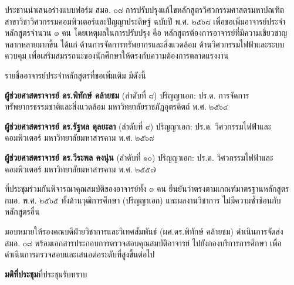 \documentclass{meetingminutes}
\begin{document}
ประธานนำเสนอร่างแบบฟอร์ม สมอ. ๐๘ การปรับปรุงแก้ไขหลักสูตรวิศวกรรมศาสตรมหาบัณฑิต
สาขาวิชาวิศวกรรมคอมพิวเตอร์และปัญญาประดิษฐ์ ฉบับปี พ.ศ. ๒๕๖๘
เพื่อขอเพิ่มอาจารย์ประจำหลักสูตรจำนวน ๓ คน โดยเหตุผลในการปรับปรุง คือ
หลักสูตรต้องการอาจารย์ที่มีความเชี่ยวชาญหลากหลายมากขึ้น ได้แก่ ด้านการจัดการทรัพยากรและสิ่งแวดล้อม
ด้านวิศวกรรมไฟฟ้าและระบบควบคุม เพื่อเสริมสมรรถนะของนักศึกษาให้ตรงกับความต้องการตลาดแรงงาน

รายชื่ออาจารย์ประจำหลักสูตรที่ขอเพิ่มเติม มีดังนี้

\begin{thailist}
  \item \textbf{ผู้ช่วยศาสตราจารย์ ดร.พิทักษ์ คล้ายชม} (ลำดับที่ ๘)
  ปริญญาเอก: ปร.ด. การจัดการทรัพยากรธรรมชาติและสิ่งแวดล้อม มหาวิทยาลัยราชภัฏอุตรดิตถ์ พ.ศ. ๒๕๖๔
  \item \textbf{ผู้ช่วยศาสตราจารย์ ดร.รัฐพล ดุลยะลา} (ลำดับที่ ๙)
  ปริญญาเอก: ปร.ด. วิศวกรรมไฟฟ้าและคอมพิวเตอร์ มหาวิทยาลัยมหาสารคาม พ.ศ. ๒๕๖๘
  \item \textbf{ผู้ช่วยศาสตราจารย์ ดร.วีระพล คงนุ่น} (ลำดับที่ ๑๐)
  ปริญญาเอก: ปร.ด. วิศวกรรมไฟฟ้าและคอมพิวเตอร์ มหาวิทยาลัยมหาสารคาม พ.ศ. ๒๕๕๗
\end{thailist}

ที่ประชุมร่วมกันพิจารณาคุณสมบัติของอาจารย์ทั้ง ๓ คน ยืนยันว่าตรงตามเกณฑ์มาตรฐานหลักสูตร กมอ. พ.ศ. ๒๕๖๕
ทั้งด้านวุฒิการศึกษา (ปริญญาเอก) และผลงานวิชาการ ไม่มีความซ้ำซ้อนกับหลักสูตรอื่น



มอบหมายให้รองคณบดีฝ่ายวิชาการและวิเทศสัมพันธ์ (ผศ.ดร.พิทักษ์ คล้ายชม) ดำเนินการจัดส่ง สมอ. ๐๘
พร้อมเอกสารประกอบการตรวจสอบคุณสมบัติอาจารย์ ไปยังกองบริการการศึกษา
เพื่อดำเนินการตรวจสอบและเสนอต่อระดับที่สูงขึ้นต่อไป

\noindent\textbf{มติที่ประชุม}\quad ที่ประชุมรับทราบ

\adjournmeeting

\begin{sigblock}
\end{sigblock}
\end{document}
